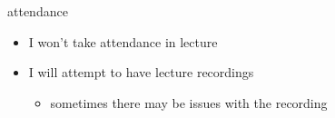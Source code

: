 \begin{frame}{attendance}
    \begin{itemize}
    \item I won't take attendance in lecture
    \item I will attempt to have lecture recordings
        \begin{itemize}
        \item sometimes there may be issues with the recording
        \end{itemize}
    \end{itemize}
\end{frame}


